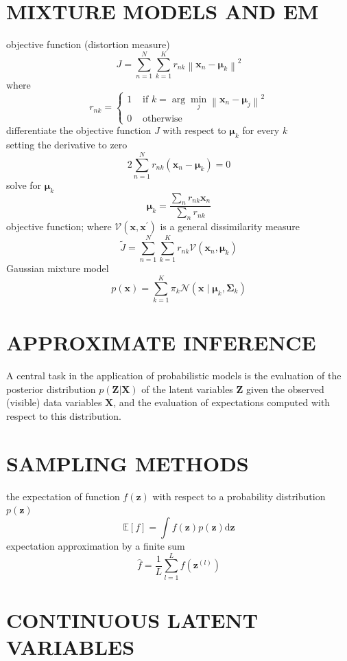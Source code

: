 \documentclass{article}
\begin{document}
	\section{MIXTURE MODELS AND EM}
	objective function (distortion measure)
	$$
	J=\sum_{n=1}^{N} \sum_{k=1}^{K} r_{n k}\left\|\mathbf{x}_{n}-\boldsymbol{\mu}_{k}\right\|^{2}
	$$
	where
	$$
	r_{n k}=\left\{\begin{array}{ll}
	1 & \text { if } k=\arg \min _{j}\left\|\mathbf{x}_{n}-\boldsymbol{\mu}_{j}\right\|^{2} \\
	0 & \text { otherwise }
	\end{array}\right.
	$$
	differentiate the objective function $J$ with respect to $\boldsymbol{\mu}_{k}$ for every $k$\\setting the derivative to zero
	$$
	2 \sum_{n=1}^{N} r_{n k}\left(\mathbf{x}_{n}-\boldsymbol{\mu}_{k}\right)=0
	$$
	solve for $\boldsymbol{\mu}_{k}$
	$$
	\boldsymbol{\mu}_{k}=\frac{\sum_{n} r_{n k} \mathbf{x}_{n}}{\sum_{n} r_{n k}}
	$$
	objective function; where $
	\mathcal{V}\left(\mathbf{x}, \mathbf{x}^{\prime}\right)
	$ is a general dissimilarity measure 
	$$
	\widetilde{J}=\sum_{n=1}^{N} \sum_{k=1}^{K} r_{n k} \mathcal{V}\left(\mathbf{x}_{n}, \boldsymbol{\mu}_{k}\right)
	$$
	Gaussian mixture model
	$$
	p(\mathbf{x})=\sum_{k=1}^{K} \pi_{k} \mathcal{N}\left(\mathbf{x} \mid \boldsymbol{\mu}_{k}, \boldsymbol{\Sigma}_{k}\right)
	$$
	
	\pagebreak
	\section{APPROXIMATE INFERENCE}
	A central task in the application of probabilistic models is the evaluation of the posterior distribution $p(\mathbf{Z}|\mathbf{X})$ of the latent variables $\mathbf{Z}$ given the observed (visible) data variables $\mathbf{X}$, and the evaluation of expectations computed with respect to this distribution.
	
	\pagebreak
	\section{SAMPLING METHODS}
	the expectation of function $f(\mathbf{z})$ with respect to a probability distribution $p(\mathbf{z})$
	$$
	\mathbb{E}[f]=\int f(\mathbf{z}) p(\mathbf{z}) \mathrm{d} \mathbf{z}
	$$
	expectation approximation by a finite sum
	$$
	\widehat{f}=\frac{1}{L} \sum_{l=1}^{L} f\left(\mathbf{z}^{(l)}\right)
	$$
	
	\pagebreak
	\section{CONTINUOUS LATENT VARIABLES}
	
\end{document}
